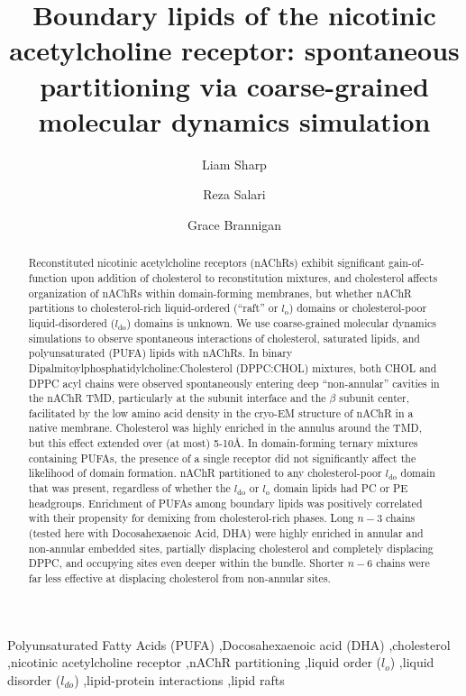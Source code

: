 \documentclass[final,3p,times,twocolumn]{elsarticle}
\newcommand{\lo}{l_{\mathrm{o}}}
\newcommand{\ldo}{l_{\mathrm{do}}}
\begin{document}
\begin{frontmatter}



\title{Boundary lipids of the nicotinic acetylcholine receptor: spontaneous partitioning via coarse-grained molecular dynamics simulation} 

\author[ccib]{Liam Sharp} 
\author[ccib,wasu]{Reza Salari}
\author[ccib,physics]{Grace Brannigan}
\address[ccib]{Center for Computational and Integrative Biology, Rutgers University-Camden, Camden, NJ}
\address[wasu]{Now at Washington University School of Medicine in St Louis}
\address[physics]{Department of Physics, Rutgers University-Camden, Camden, NJ}

\begin{abstract}
Reconstituted nicotinic acetylcholine receptors (nAChRs) exhibit significant gain-of-function upon addition of cholesterol to reconstitution mixtures, and cholesterol affects organization of nAChRs within domain-forming membranes, but whether nAChR partitions to cholesterol-rich liquid-ordered (``raft'' or $\lo$) domains or cholesterol-poor liquid-disordered ($\ldo$) domains is unknown. We use coarse-grained molecular dynamics simulations to observe spontaneous interactions of cholesterol, saturated lipids, and polyunsaturated (PUFA) lipids with nAChRs. In binary Dipalmitoylphosphatidylcholine:Cholesterol (DPPC:CHOL) mixtures, both CHOL and DPPC acyl chains were observed spontaneously entering deep ``non-annular'' cavities in the nAChR TMD, particularly at the subunit interface and the $\beta$ subunit center, facilitated by the low amino acid density in the cryo-EM structure of nAChR in a native membrane. Cholesterol was highly enriched in the annulus around the TMD, but this effect extended over (at most) 5-10\AA. In domain-forming ternary mixtures containing PUFAs, the presence of a single receptor did not significantly affect the likelihood of domain formation.  nAChR partitioned to any cholesterol-poor $\ldo$ domain that was present, regardless of whether the $\ldo$ or $\lo$ domain lipids had PC or PE headgroups. Enrichment of PUFAs among boundary lipids was positively correlated with their propensity for demixing from cholesterol-rich phases. Long $n - 3$ chains (tested here with Docosahexaenoic Acid, DHA) were highly enriched in annular and non-annular embedded sites, partially displacing cholesterol and completely displacing DPPC, and occupying sites even deeper within the bundle. Shorter $n - 6$ chains were far less effective at displacing cholesterol from non-annular sites.
\end{abstract}

\begin{keyword}
Polyunsaturated Fatty Acids (PUFA) \sep Docosahexaenoic acid (DHA) \sep cholesterol \sep nicotinic acetylcholine receptor \sep nAChR partitioning \sep liquid order ($l_o$) \sep liquid disorder ($l_{do}$) \sep lipid-protein interactions \sep lipid rafts


\end{keyword}

\end{frontmatter}
\linenumbers
\end{document}
